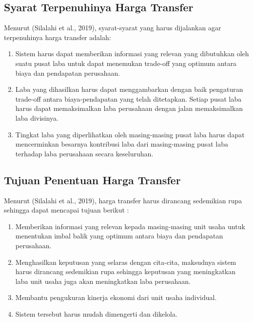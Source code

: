 \subsection{Syarat Terpenuhinya Harga Transfer}

Menurut (Silalahi et al., 2019), syarat-syarat yang harus dijalankan agar terpenuhinya harga transfer adalah:

\begin{enumerate}
	\item Sistem harus dapat memberikan informasi yang relevan yang dibutuhkan oleh suatu pusat laba untuk dapat menemukan trade-off yang optimum antara biaya dan pendapatan perusahaan.
	\item Laba yang dihasilkan harus dapat menggambarkan dengan baik pengaturan trade-off antara biaya-pendapatan yang telah ditetapkan. Setiap pusat laba harus dapat memaksimalkan laba perusahaan dengan jalan memaksimalkan laba divisinya.
	\item Tingkat laba yang diperlihatkan oleh masing-masing pusat laba harus dapat mencerminkan besarnya kontribusi laba dari masing-masing pusat laba terhadap laba perusahaan secara keseluruhan.	
\end{enumerate}

\subsection{Tujuan Penentuan Harga Transfer}

Menurut (Silalahi et al., 2019), harga transfer harus dirancang sedemikian rupa sehingga dapat mencapai tujuan berikut :

\begin{enumerate}
	\item Memberikan informasi yang relevan kepada masing-masing unit usaha untuk menentukan imbal balik yang optimum antara biaya dan pendapatan perusahaan.
	\item Menghasilkan keputusan yang selaras dengan cita-cita, maksudnya sistem harus dirancang sedemikian rupa sehingga keputusan yang meningkatkan laba unit usaha juga akan meningkatkan laba perusahaan.
	\item Membantu pengukuran kinerja ekonomi dari unit usaha individual.
	\item Sistem tersebut harus mudah dimengerti dan dikelola.
\end{enumerate}

